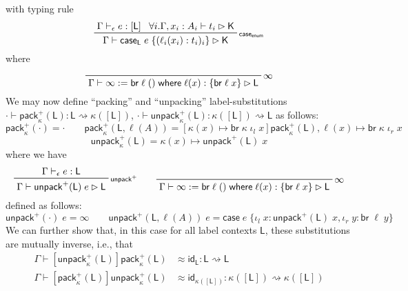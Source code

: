 \documentclass[acmsmall,screen,review]{acmart}
\newcommand{\ms}[1]{\ensuremath{\mathsf{#1}}}
\newcommand{\lto}{:}
\newcommand{\linl}[1]{\iota_l\;{#1}}
\newcommand{\linr}[1]{\iota_r\;{#1}}
\newcommand{\brb}[2]{\ms{br}\;#1\;#2}
\newcommand{\casestmt}[5]{\ms{case}\;#1\;\{\linl{#2} \lto #3, \linr{#4} \lto #5\}}
\newcommand{\where}[2]{#1\;\ms{where}\;#2}
\newcommand{\wbranch}[3]{#1(#2) \lto \{#3\}}
\newcommand{\bhyp}[2]{#1 : #2}
\newcommand{\rle}[1]{{\scriptsize\textsf{#1}}}
\newcommand{\hasty}[4]{#1 \vdash_{#2} #3: {#4}}
\newcommand{\haslb}[3]{#1 \vdash #2 \rhd #3}
\newcommand{\lbsubst}[4]{#1 \vdash #2: #3 \rightsquigarrow #4}
\newcommand{\teqv}{\approx}
\begin{document}
with typing rule
\begin{equation}
  \prftree[r]{\rle{$\ms{case}_{\ms{enum}}$}}
    {\hasty{\Gamma}{\epsilon}{e}{[\ms{L}]}}
    {\forall i. \haslb{\Gamma, \bhyp{x_i}{A_i}}{t_i}{\ms{K}}}
    {\haslb{\Gamma}{\ms{case}_{\ms{L}}\;e\;\{(\ell_i(x_i): t_i)_i\}}{\ms{K}}}
\end{equation}
where
\begin{equation}
  \prftree[r]{$\infty$}
    {\haslb{\Gamma}{\infty := \where{\brb{\ell}{()}}{\wbranch{\ell}{x}{\brb{\ell}{x}}}}{\ms{L}}}
\end{equation}
We may now define ``packing'' and ``unpacking'' label-substitutions
$\lbsubst{\cdot}{\ms{pack}_\kappa^+(\ms{L})}{\ms{L}}{\kappa([\ms{L}])}$,
$\lbsubst{\cdot}{\ms{unpack}_\kappa^+(\ms{L})}{\kappa([\ms{L}])}{\ms{L}}$ as follows:
\begin{equation}
  \ms{pack}_\kappa^+(\cdot) = \cdot \qquad
  \ms{pack}_\kappa^+(\ms{L}, \ell(A)) 
  = [\kappa(x) \mapsto \brb{\kappa}{\iota_l\;x}]\ms{pack}_\kappa^+(\ms{L}), 
    \ell(x) \mapsto \brb{\kappa}{\iota_r\;x}  
\end{equation}
\begin{equation}
  \ms{unpack}_\kappa^+(\ms{L}) = \kappa(x) \mapsto \ms{unpack}^+(\ms{L})\;x
\end{equation}
where we have
\begin{equation}
  \prftree[r]{\rle{unpack$^+$}}
    {\hasty{\Gamma}{\epsilon}{e}{\ms{L}}}
    {\haslb{\Gamma}{\ms{unpack}^+(\ms{L})\;e}{\ms{L}}} \qquad
  \prftree[r]{$\infty$}
    {\haslb{\Gamma}{\infty := \where{\brb{\ell}{()}}{\wbranch{\ell}{x}{\brb{\ell}{x}}}}{\ms{L}}}
\end{equation}
defined as follows:
\begin{equation}
  \ms{unpack}^+(\cdot)\;e = \infty \qquad
  \ms{unpack}^+(\ms{L}, \ell(A))\;e = \casestmt{e}{x}{\ms{unpack}^+(\ms{L})\;x}{y}{\brb{\ell}{y}}
\end{equation}
We can further show that, in this case for all label contexts $\ms{L}$, these substitutions are
mutually inverse, i.e., that
\begin{equation}
  \begin{aligned}
  \lbsubst{\Gamma}
    {[\ms{unpack}_\kappa^+(\ms{L})]\ms{pack}_\kappa^+(\ms{L}) 
      &\teqv \ms{id}_{\ms{L}}}{\ms{L}}{\ms{L}}
  \\
  \lbsubst{\Gamma}
    {[\ms{pack}_\kappa^+(\ms{L})]\ms{unpack}_\kappa^+(\ms{L}) &\teqv \ms{id}_{\kappa([\ms{L}])}}
    {\kappa([\ms{L}])}{\kappa([\ms{L}])}
  \end{aligned}
\end{equation}
\end{document}
